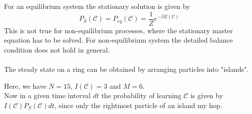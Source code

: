For an equilibrium system the stationary solution is given by
\begin{equation*}
	P_S(\mathcal{C})=P_{eq}(\mathcal{C})=\frac{1}{Z}e^{-\beta E(\mathcal{C})}
\end{equation*}
This is not true for non-equilibrium processes, where the stationary master equation has to be solved. For non-equilibrium system the detailed balance condition does not hold in general.\vspace{2mm}\\
\textbf{\underline{}}\vspace{3mm}\\
The steady state on a ring can be obtained by arranging particles into "{}islands".
\begin{figure}[H]
	\centering
\end{figure}
\noindent Here, we have $N=15$, $I(\mathcal{C})=3$ and $M=6$.\\
Now in a given time interval $dt$ the probability of learning $\mathcal{C}$ is given by $I(\mathcal{C})P_S(\mathcal{C})dt$, since only the rightmost particle of an island my hop.
